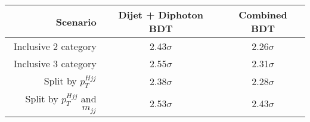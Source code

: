 \begin{tabular}{ r | c | c }
\hline
Scenario                          & Dijet + Diphoton BDT    & Combined BDT   \\
\hline
Inclusive 2 category              & 2.43$\sigma$            & 2.26$\sigma$   \\
Inclusive 3 category              & 2.55$\sigma$            & 2.31$\sigma$   \\
Split by $p_T^{Hjj}$              & 2.38$\sigma$            & 2.28$\sigma$   \\
Split by $p_T^{Hjj}$ and $m_{jj}$ & 2.53$\sigma$            & 2.43$\sigma$   \\
\hline
\end{tabular}
